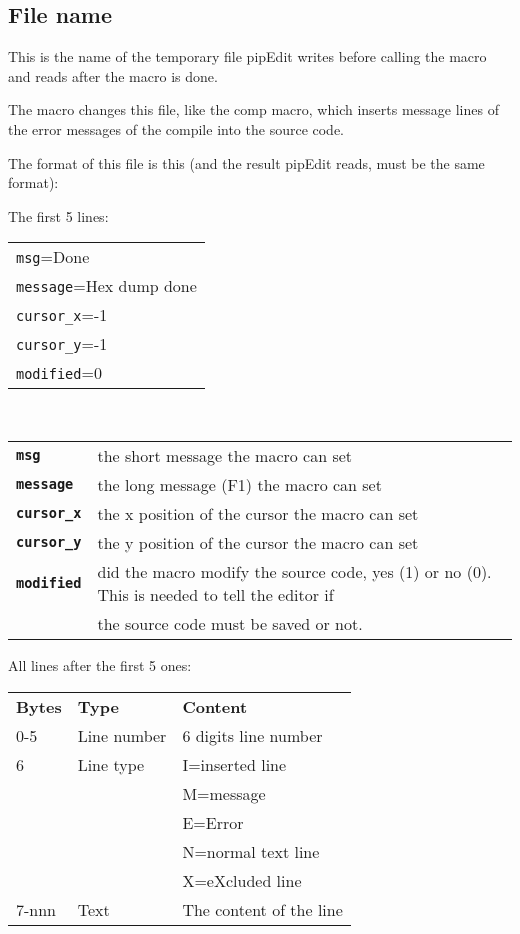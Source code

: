 \documentclass{report}
\begin{document}
\subsection{File name}
This is the name of the temporary file pipEdit writes before calling the macro and reads after the macro is done.

The macro changes this file, like the comp macro, which inserts message lines of the error messages of the compile into the source code.

The format of this file is this (and the result pipEdit reads, must be the same format):

The first 5 lines: \\

\begin{tabular}{l}
\texttt{msg}=Done\\
\texttt{message}=Hex dump done \\
\texttt{cursor\_x}=-1 \\
\texttt{cursor\_y}=-1 \\
\texttt{modified}=0 \\
\end{tabular}
\\
\begin{tabular}{l l}
\textbf{\texttt{msg}} & the short message the macro can set \\
\textbf{\texttt{message}} & the long message (F1) the macro can set \\
\textbf{\texttt{cursor\_x}} & the x position of the cursor the macro can set \\
\textbf{\texttt{cursor\_y}} & the y position of the cursor the macro can set \\
\textbf{\texttt{modified}} & did the macro modify the source code, yes (1) or no (0). This is needed to tell the editor if \\ 
 & the source code must be saved or not. \\
\end{tabular}
\newpage
All lines after the first 5 ones: \\

\begin{tabular}{l l l}
\textbf{Bytes} & \textbf{Type}        & \textbf{Content} \\
0-5            & Line number          & 6 digits line number \\
6              & Line type            & I=inserted line \\
               &                      & M=message\\
               &                      & E=Error \\
               &                      & N=normal text line \\
               &                      & X=eXcluded line \\
7-nnn          & Text                 & The content of the line \\
\end{tabular}
\end{document}
